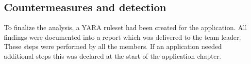 \documentclass{article}
\begin{document}
\subsection{Countermeasures and detection}

To finalize the analysis, a YARA ruleset had been created for the application. All findings were documented into a report which was delivered to the team leader. These steps were performed by all the members. If an application needed additional steps this was declared at the start of the application chapter.


\begin{thebibliography}{9}
\end{thebibliography}
\end{document}
